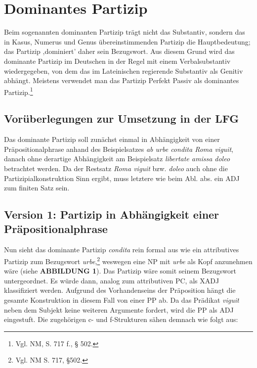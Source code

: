 \documentclass[12pt,a4paper]{article}
\begin{document}
\section{Dominantes Partizip}
Beim sogenannten dominanten Partizip trägt nicht das Substantiv, sondern das in Kasus, Numerus und Genus übereinstimmenden Partizip die Hauptbedeutung; das Partizip ,dominiert' daher sein Bezugswort.
Aus diesem Grund wird das dominante Partizip im Deutschen in der Regel mit einem Verbalsubstantiv wiedergegeben, von dem das im Lateinischen regierende Substantiv als Genitiv abhängt. Meistens verwendet man das Partizip Perfekt Passiv als dominantes Partizip.\footnote{Vgl. NM, S. 717 f., § 502.}\\

\subsection{Vorüberlegungen zur Umsetzung in der LFG}
Das dominante Partizip soll zunächst einmal in Abhängigkeit von einer Präpositionalphrase anhand des Beispielsatzes \textit{ab urbe condita Roma viguit}, danach ohne derartige Abhängigkeit am Beispielsatz \textit{libertate amissa doleo} betrachtet werden. Da der Restsatz \textit{Roma viguit} bzw. \textit{doleo} auch ohne die Partizipialkonstruktion Sinn ergibt, muss letztere wie beim Abl. abs. ein ADJ zum finiten Satz sein.

\subsection{Version 1: Partizip in Abhängigkeit einer Präpositionalphrase}
Nun sieht das dominante Partizip \textit{condita} rein formal aus wie ein attributives Partizip zum Bezugswort \textit{urbe},\footnote{Vgl. NM S. 717, §502.} weswegen eine NP mit \textit{urbe} als Kopf anzunehmen wäre (siehe \textbf{ABBILDUNG 1}). Das Partizip wäre somit seinem Bezugswort untergeordnet. Es würde dann, analog zum attributiven PC, als XADJ klassifiziert werden. Aufgrund des Vorhandenseins der Präposition hängt die gesamte Konstruktion in diesem Fall von einer PP ab. Da das Prädikat \textit{viguit} neben dem Subjekt keine weiteren Argumente fordert, wird die PP als ADJ eingestuft. Die zugehörigen c- und f-Strukturen sähen demnach wie folgt aus:
\end{document}
